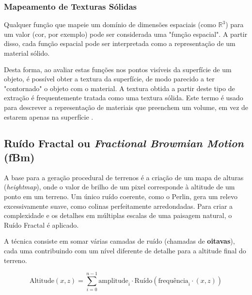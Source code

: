 \subsubsection{Mapeamento de Texturas Sólidas}
Qualquer função que mapeie um domínio de dimensões espaciais (como $\mathbb{R}^3$) para um valor (cor, por exemplo) pode ser considerada uma "função espacial". A partir disso, cada função espacial pode ser interpretada como a representação de um material sólido.

Desta forma, ao avaliar estas funções nos pontos visíveis da superfície de um objeto, é possível obter a textura da superfície, de modo parecido a ter "contornado" o objeto com o material. A textura obtida a partir deste tipo de extração é frequentemente tratada como uma textura sólida. Este termo é usado para descrever a representação de materiais que preenchem um volume, em vez de estarem apenas na superfície \cite{fractalNoise}.

\subsection{Ruído Fractal ou \textit{Fractional Browmian Motion} (fBm)}

A base para a geração procedural de terrenos é a criação de um mapa de alturas (\textit{heightmap}), onde o valor de brilho de um pixel corresponde à altitude de um ponto em um terreno. Um único ruído coerente, como o Perlin, gera um relevo excessivamente suave, como colinas perfeitamente arredondadas. Para criar a complexidade e os detalhes em múltiplas escalas de uma paisagem natural, o Ruído Fractal é aplicado.

A técnica consiste em somar várias camadas de ruído (chamadas de \textbf{oitavas}), cada uma contribuindo com um nível diferente de detalhe para a altitude final do terreno.

\begin{equation*}
\text{Altitude}(x, z) = \sum_{i=0}^{n-1} \text{amplitude}_i \cdot \text{Ruído}(\text{frequência}_i \cdot (x, z))
\end{equation*}

